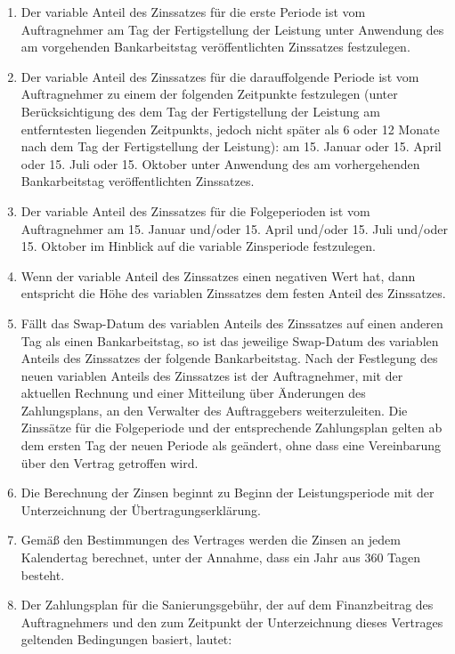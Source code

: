 \begin{enumerate}
\item{Der variable Anteil des Zinssatzes für die erste Periode ist vom Auftragnehmer am Tag der Fertigstellung der Leistung unter Anwendung des am vorgehenden Bankarbeitstag veröffentlichten Zinssatzes festzulegen.}
\item{Der variable Anteil des Zinssatzes für die darauffolgende Periode ist vom Auftragnehmer zu einem der folgenden Zeitpunkte festzulegen (unter Berücksichtigung des dem Tag der Fertigstellung der Leistung am entferntesten liegenden Zeitpunkts, jedoch nicht später als 6 oder 12 Monate nach dem Tag der Fertigstellung der Leistung): am 15. Januar oder 15. April oder 15. Juli oder 15. Oktober unter Anwendung des am vorhergehenden Bankarbeitstag veröffentlichten Zinssatzes.}
\item{Der variable Anteil des Zinssatzes für die Folgeperioden ist vom Auftragnehmer am 15. Januar und/oder 15. April und/oder 15. Juli und/oder 15. Oktober im Hinblick auf die variable Zinsperiode festzulegen.}
\item{Wenn der variable Anteil des Zinssatzes einen negativen Wert hat, dann entspricht die Höhe des variablen Zinssatzes dem festen Anteil des Zinssatzes.}
\item{Fällt das Swap-Datum des variablen Anteils des Zinssatzes auf einen anderen Tag als einen Bankarbeitstag, so ist das jeweilige Swap-Datum des variablen Anteils des Zinssatzes der folgende Bankarbeitstag. Nach der Festlegung des neuen variablen Anteils des Zinssatzes ist der Auftragnehmer, mit der aktuellen Rechnung und einer Mitteilung über Änderungen des Zahlungsplans, an den Verwalter des Auftraggebers weiterzuleiten. Die Zinssätze für die Folgeperiode und der entsprechende Zahlungsplan gelten ab dem ersten Tag der neuen Periode als geändert, ohne dass eine Vereinbarung über den Vertrag getroffen wird.}
\item{Die Berechnung der Zinsen beginnt zu Beginn der Leistungsperiode mit der Unterzeichnung der Übertragungserklärung.}
\item{Gemäß den Bestimmungen des Vertrages werden die Zinsen an jedem Kalendertag berechnet, unter der Annahme, dass ein Jahr aus 360 Tagen besteht.}
\item{Der Zahlungsplan für die Sanierungsgebühr, der auf dem Finanzbeitrag des Auftragnehmers und den zum Zeitpunkt der Unterzeichnung dieses Vertrages geltenden Bedingungen basiert, lautet:}


\begin{center}
\end{center}



\end{enumerate}
